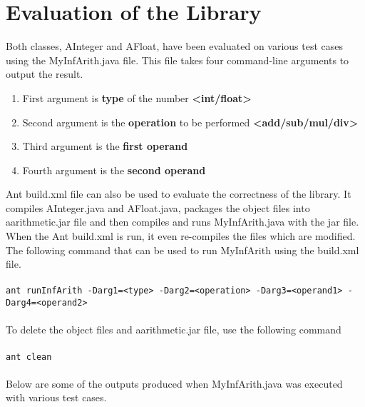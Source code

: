 \documentclass[a4paper,12pt]{article}
\begin{document}
\section{Evaluation of the Library}

Both classes, AInteger and AFloat, have been evaluated on various test cases using the MyInfArith.java file. This file takes four command-line arguments to output the result.

\begin{enumerate}
    \item First argument is \textbf{type} of the number \textbf{<int/float>}
    \item Second argument is the \textbf{operation }to be performed \textbf{<add/sub/mul/div>}
    \item Third argument is the \textbf{first operand}
    \item Fourth argument is the \textbf{second operand}
\end{enumerate}
Ant build.xml file can also be used to evaluate the correctness of the library. It compiles AInteger.java and AFloat.java, packages the object files into aarithmetic.jar file and then compiles and runs MyInfArith.java with the jar file. When the Ant build.xml is run, it even re-compiles the files which are modified.
The following command that can be used to run MyInfArith using the build.xml file.\\\\
\texttt{ant runInfArith -Darg1=<type> -Darg2=<operation> -Darg3=<operand1> -Darg4=<operand2>}\\\\
To delete the object files and aarithmetic.jar file, use the following command\\\\
\texttt{ant clean}\\\\
Below are some of the outputs produced when MyInfArith.java was executed with various test cases.\\
\end{document}
